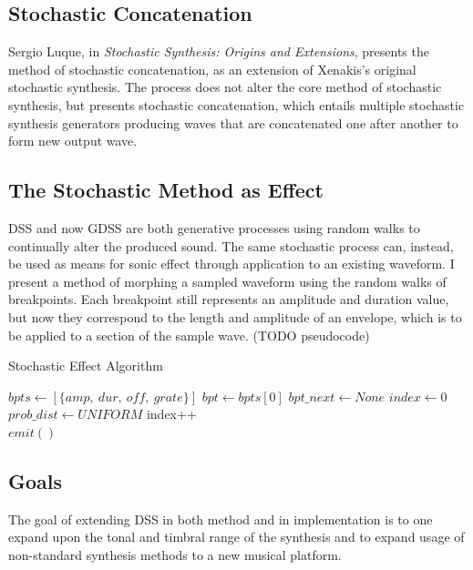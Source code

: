 \documentclass[10pt]{article}
\begin{document}
\subsection{Stochastic Concatenation}
Sergio Luque, in \textit{Stochastic Synthesis: Origins and Extensions}, presents the method of stochastic concatenation, as an extension of Xenakis's original stochastic synthesis.\citep{sergio2006} The process does not alter the core method of stochastic synthesis, but presents stochastic concatenation, which entails multiple stochastic synthesis generators producing waves that are concatenated one after another to form new output wave. 

\subsection{The Stochastic Method as Effect}
DSS and now GDSS are both generative processes using random walks to continually alter the produced sound. The same stochastic process can, instead, be used as means for sonic effect through application to an existing waveform. I present a method of morphing a sampled waveform using the random walks of breakpoints. Each breakpoint still represents an amplitude and duration value, but now they correspond to the length and amplitude of an envelope, which is to be applied to a section of the sample wave. (TODO pseudocode)

\begin{algorithm}
\caption{Stochastic Effect Algorithm}
    \begin{algorithmic}
        \STATE $bpts\gets [\{amp,\ dur,\ off,\ grate\}]$
        \STATE $bpt\gets bpts[0]$
        \STATE $bpt\_next\gets None$
        \STATE $index\gets 0$
        \STATE $prob\_dist\gets UNIFORM$
        \LOOP
                \STATE index++\\
            \ENDIF
            \STATE $emit()$
        \ENDLOOP
    \end{algorithmic}
\end{algorithm}

\subsection{Goals}
The goal of extending DSS in both method and in implementation is to one expand upon the tonal and timbral range of the synthesis and to expand usage of non-standard synthesis methods to a new musical platform. 
\end{document}
